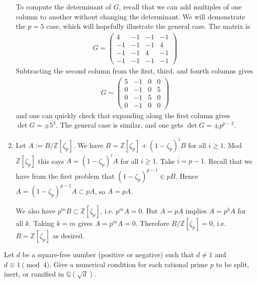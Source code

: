 \documentclass[12pt]{article}  %
\begin{document}
\begin{solution}
\begin{enumerate}
To compute the determinant of $G$, recall that we can add multiples of one column to another without changing the determinant. We will demonstrate the $p=5$ case, which will hopefully illustrate the general case. The matrix is \begin{align*}
    G = \begin{pmatrix}
        4 & -1 & -1 & -1 \\
        -1 & -1 & -1 & 4 \\
        -1 & -1 & 4 & -1 \\
        -1 & -1 & -1 & -1
    \end{pmatrix}
\end{align*}
Subtracting the second column from the first, third, and fourth columns gives \begin{align*}
    G \sim \begin{pmatrix}
        5 & -1 & 0 & 0 \\
        0 & -1 & 0 & 5 \\
        0 & -1 & 5 & 0 \\
        0 & -1 & 0 & 0
    \end{pmatrix}
\end{align*}
and one can quickly check that expanding along the first column gives $\det G = \pm 5^3$. The general case is similar, and one gets $\det G = \pm p^{p-2}$.

\item Let $A:=B/\mathbb{Z}[\zeta_p]$. We have $B=\mathbb{Z}[\zeta_p]+(1-\zeta_p)^iB$ for all $i\ge1$. Mod $\mathbb{Z}[\zeta_p]$ this says $A=(1-\zeta_p)^iA$ for all $i\ge1$. Take $i=p-1$. Recall that we have from the first problem that $(1-\zeta_p)^{p-1}\in pB$.
Hence $A=(1-\zeta_p)^{p-1}A\subset pA$, so $A=pA$.

We also have $p^{m}B\subset \mathbb{Z}[\zeta_p]$, i.e. $p^{m}A=0$. But $A=pA$ implies $A=p^kA$ for all $k$. Taking $k=m$ gives $A=p^{m}A=0$. Therefore $B/\mathbb{Z}[\zeta_p]=0$, i.e. $B=\mathbb{Z}[\zeta_p]$ as desired.
    \end{enumerate}
\end{solution}

\begin{problem}{3}
Let $d$ be a square-free number (positive or negative) such that $d \neq 1$ and $d \equiv 1 \pmod{4}$.
Give a numerical condition for each rational prime $p$ to be split, inert, or ramified in $\mathbb{Q}(\sqrt{d})$.
\end{problem}
\end{document}
